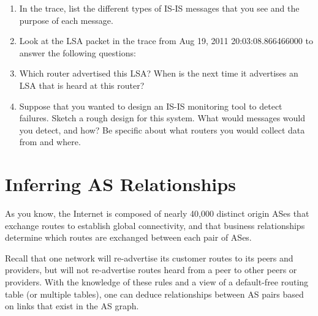 \documentclass[11pt]{article}
\begin{document}
\begin{enumerate}
\item In the trace, list the different types of IS-IS messages that you
  see and the purpose of each message.
\item Look at the LSA packet in the trace from Aug 19, 2011
  20:03:08.866466000  to answer the following
  questions:
\setcounter{listcount}{0}
\item Which router advertised this LSA?  When is the next time it
  advertises an LSA that is heard at this router?
\item Suppose that you wanted to design an IS-IS monitoring tool to
  detect failures.  Sketch a rough design for this system.  What would
  messages would you detect, and how?  Be specific about what routers
  you would collect data from and where.
\end{enumerate}


\section{Inferring AS Relationships}

As you know, the Internet is composed of nearly 40,000 distinct origin
ASes that exchange routes to establish global connectivity, and that
business relationships determine which routes are exchanged between each
pair of ASes.  

Recall that one network will re-advertise its customer routes to its
peers and providers, but will not re-advertise routes heard from a peer
to other peers or providers.  With the knowledge of these rules and a
view of a default-free routing table (or multiple tables), one can
deduce relationships between AS pairs based on links that exist in the
AS graph.  
\end{document}
